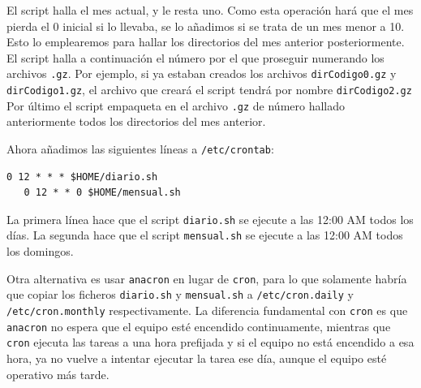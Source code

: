 \documentclass[a4paper,10pt]{article}
\newenvironment{answer}{%
\begin{list}{}{%
}%
\item[]}{\end{list}}
\begin{document}
\begin{answer}
  El script halla el mes actual, y le resta uno. Como esta operación hará que el mes pierda el 0 inicial si lo llevaba, se lo añadimos
  si se trata de un mes menor a 10. Esto lo emplearemos para hallar los directorios del mes anterior posteriormente.
  El script halla a continuación el número por el que proseguir numerando los archivos \texttt{.gz}. Por ejemplo, si ya estaban
  creados los archivos \texttt{dirCodigo0.gz} y \texttt{dirCodigo1.gz}, el archivo que creará el script tendrá por nombre \texttt{dirCodigo2.gz}
  Por último el script empaqueta en el archivo \texttt{.gz} de número hallado anteriormente todos los directorios del mes anterior.

  Ahora añadimos las siguientes líneas a \texttt{/etc/crontab}:
  \begin{lstlisting}[style=BashInputStyle]
   0 12 * * * $HOME/diario.sh
   0 12 * * 0 $HOME/mensual.sh
  \end{lstlisting}
  
  La primera línea hace que el script \texttt{diario.sh} se ejecute a las 12:00 AM  todos los días.
  La segunda hace que el script \texttt{mensual.sh} se ejecute a las 12:00 AM todos los domingos.
  
  Otra alternativa es usar \texttt{anacron} en lugar de \texttt{cron}, para lo que solamente habría que copiar
  los ficheros \texttt{diario.sh} y \texttt{mensual.sh} a \texttt{/etc/cron.daily} y \texttt{/etc/cron.monthly} respectivamente.
  La diferencia fundamental con \texttt{cron} es que \texttt{anacron} no espera que el equipo esté encendido continuamente, mientras que
  \texttt{cron} ejecuta las tareas a una hora prefijada y si el equipo no está encendido a esa hora, ya no vuelve a intentar ejecutar la tarea
  ese día, aunque el equipo esté operativo más tarde.
  
  \cite{cron} \cite{anacron}
  \end{answer}
\end{document}

